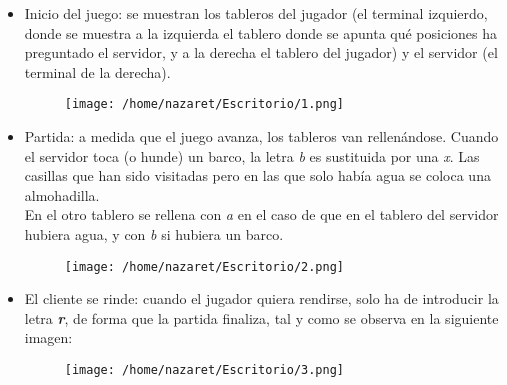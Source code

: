 \documentclass[11pt,a4paper]{article}
\begin{document}
\begin{itemize}
	\item Inicio del juego: se muestran los tableros del jugador (el terminal izquierdo, donde se muestra a la izquierda el tablero donde se apunta qué posiciones ha preguntado el servidor, y a la derecha el tablero del jugador) y el servidor (el terminal de la derecha).
	
	\begin{figure}[H]
	\centering
	\texttt{[image: /home/nazaret/Escritorio/1.png]}
	\end{figure}
	
	\item Partida: a medida que el juego avanza, los tableros van rellenándose. Cuando el servidor toca (o hunde) un barco, la letra \textit{b} es sustituida por una \textit{x}. Las casillas que han sido visitadas pero en las que solo había agua se coloca una almohadilla.\\
	
	En el otro tablero se rellena con \textit{a} en el caso de que en el tablero del servidor hubiera agua, y con \textit{b} si hubiera un barco. 

	\begin{figure}[H]
	\centering
	\texttt{[image: /home/nazaret/Escritorio/2.png]}
	\end{figure}

	\item El cliente se rinde: cuando el jugador quiera rendirse, solo ha de introducir la letra \textit{\textbf{r}}, de forma que la partida finaliza, tal y como se observa en la siguiente imagen:
	
	\begin{figure}[H]
	\centering
	\texttt{[image: /home/nazaret/Escritorio/3.png]}
	\end{figure}
\end{itemize}
\end{document}
